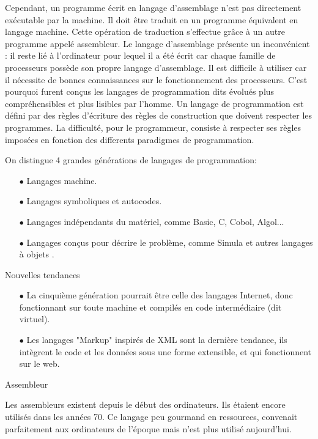 \documentclass[a4paper,12pt]{article} %
\begin{document}
Cependant, un programme écrit en langage d'assemblage n'est pas directement exécutable par la machine. Il doit être traduit en un programme équivalent en langage machine. Cette opération de traduction s'effectue grâce à un autre programme appelé assembleur.
Le langage d'assemblage présente un inconvénient : il reste lié à l'ordinateur pour lequel il a été écrit car chaque famille de processeurs possède son propre langage d'assemblage. Il est difficile à utiliser car il nécessite de bonnes connaissances sur le fonctionnement des processeurs.
C'est pourquoi furent conçus les langages de programmation dits évolués plus compréhensibles et plus lisibles par l'homme.
Un langage de programmation est défini par des règles d'écriture des règles de construction que doivent respecter les programmes. La difficulté, pour le programmeur, consiste à respecter ses règles imposées en fonction des differents paradigmes de programmation.



On distingue 4 grandes générations de langages de programmation:
\begin{itemize}
   \item[$\bullet$]Langages machine.
   \item[$\bullet$]Langages symboliques et autocodes.
   \item[$\bullet$]Langages indépendants du matériel, comme Basic, C, Cobol, Algol...
   \item[$\bullet$]Langages conçus pour décrire le problème, comme Simula et autres langages à objets .
\end{itemize}
   Nouvelles tendances 
\begin{itemize}   
\item[$\bullet$] La cinquième génération pourrait être celle des langages Internet, donc fonctionnant sur toute
machine et compilés en code intermédiaire (dit virtuel).
\item[$\bullet$] Les langages "Markup" inspirés de XML sont la dernière tendance, ils intègrent le code et les
données sous une forme extensible, et qui fonctionnent sur le web.
\end{itemize}
Assembleur
 
 Les assembleurs existent depuis le début des ordinateurs. Ils étaient encore utilisés dans les années 70. Ce langage peu gourmand en ressources, convenait parfaitement aux ordinateurs de l’époque mais n’est plus utilisé aujourd’hui.
 
\end{document}
